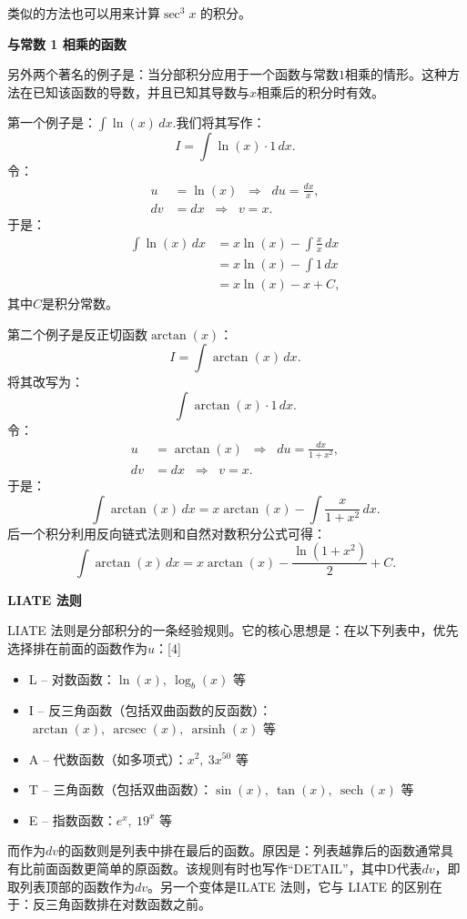 类似的方法也可以用来计算$\sec^{3}x$ 的积分。

\textbf{与常数 1 相乘的函数}

另外两个著名的例子是：当分部积分应用于一个函数与常数$1$相乘的情形。这种方法在已知该函数的导数，并且已知其导数与$x$相乘后的积分时有效。

第一个例子是：$\int \ln(x)\,dx$.我们将其写作：
$$
I = \int \ln(x)\cdot 1\,dx.~
$$
令：
$$
\begin{aligned}
u &= \ln(x) \;\;\Rightarrow\;\; du = \frac{dx}{x},\\
dv &= dx \;\;\Rightarrow\;\; v = x.
\end{aligned}~
$$
于是：
$$
\begin{aligned}
\int \ln(x)\,dx 
&= x\ln(x) - \int \frac{x}{x}\,dx \\
&= x\ln(x) - \int 1\,dx \\
&= x\ln(x) - x + C,
\end{aligned}~
$$
其中$C$是积分常数。

第二个例子是反正切函数$\arctan(x)$：
$$
I = \int \arctan(x)\,dx.~
$$
将其改写为：
$$
\int \arctan(x)\cdot 1\,dx.~
$$
令：
$$
\begin{aligned}
u &= \arctan(x) \;\;\Rightarrow\;\; du = \frac{dx}{1+x^{2}},\\
dv &= dx \;\;\Rightarrow\;\; v = x.
\end{aligned}~
$$
于是：
$$
\int \arctan(x)\,dx 
= x\arctan(x) - \int \frac{x}{1+x^{2}}\,dx.~
$$
后一个积分利用反向链式法则和自然对数积分公式可得：
$$
\int \arctan(x)\,dx 
= x\arctan(x) - \frac{\ln(1+x^{2})}{2} + C.~
$$

\textbf{LIATE 法则}

LIATE 法则是分部积分的一条经验规则。它的核心思想是：在以下列表中，优先选择排在前面的函数作为$u$：[4]
\begin{itemize}
\item L – 对数函数：$\ln(x),\ \log_{b}(x)$ 等
\item I – 反三角函数（包括双曲函数的反函数）：$\arctan(x),\ \operatorname{arcsec}(x),\ \operatorname{arsinh}(x)$ 等
\item A – 代数函数（如多项式）：$x^{2},\ 3x^{50}$ 等
\item T – 三角函数（包括双曲函数）：$\sin(x),\ \tan(x),\ \operatorname{sech}(x)$ 等
\item E – 指数函数：$e^{x},\ 19^{x}$ 等
\end{itemize}
而作为$dv$的函数则是列表中排在最后的函数。原因是：列表越靠后的函数通常具有比前面函数更简单的原函数。该规则有时也写作“DETAIL”，其中D代表$dv$，即取列表顶部的函数作为$dv$。另一个变体是ILATE 法则，它与 LIATE 的区别在于：反三角函数排在对数函数之前。

